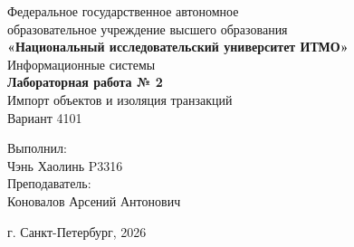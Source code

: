 \begin{titlepage}
\centering
Федеральное государственное автономное \\
образовательное учреждение высшего образования \\
\textbf{«Национальный исследовательский университет ИТМО»} \\
\vfill
Информационные системы\\
\vspace{0.5\baselineskip}
\textbf{Лабораторная работа № 2} \\
\vspace{0.5\baselineskip}
Импорт объектов и изоляция транзакций\\
Вариант 4101\\
\vfill
\begin{flushright}
Выполнил:\\
Чэнь Хаолинь P3316\\
Преподаватель:\\
Коновалов Арсений Антонович\\
\end{flushright}
\vspace{4\baselineskip}
\centering
г. Санкт-Петербург, 2026
\end{titlepage}

